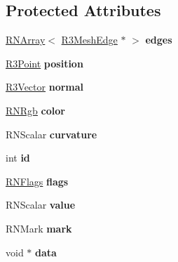 \subsection*{Protected Attributes}
\begin{DoxyCompactItemize}
\item 
\hyperlink{class_r_n_array}{R\+N\+Array}$<$ \hyperlink{class_r3_mesh_edge}{R3\+Mesh\+Edge} $\ast$ $>$ {\bfseries edges}\hypertarget{class_r3_mesh_vertex_ac82c048634a0ff8869a69ea2da8d3710}{}\label{class_r3_mesh_vertex_ac82c048634a0ff8869a69ea2da8d3710}

\item 
\hyperlink{class_r3_point}{R3\+Point} {\bfseries position}\hypertarget{class_r3_mesh_vertex_a6fa33f78f341f24a2385a874323f8a1a}{}\label{class_r3_mesh_vertex_a6fa33f78f341f24a2385a874323f8a1a}

\item 
\hyperlink{class_r3_vector}{R3\+Vector} {\bfseries normal}\hypertarget{class_r3_mesh_vertex_aa923ea74d42e30462aeb01cf34689dbe}{}\label{class_r3_mesh_vertex_aa923ea74d42e30462aeb01cf34689dbe}

\item 
\hyperlink{class_r_n_rgb}{R\+N\+Rgb} {\bfseries color}\hypertarget{class_r3_mesh_vertex_a8c7f99ac5454c989550632784ae80f43}{}\label{class_r3_mesh_vertex_a8c7f99ac5454c989550632784ae80f43}

\item 
R\+N\+Scalar {\bfseries curvature}\hypertarget{class_r3_mesh_vertex_abd8ef10ffc5c6852ae2fd7003d8577fe}{}\label{class_r3_mesh_vertex_abd8ef10ffc5c6852ae2fd7003d8577fe}

\item 
int {\bfseries id}\hypertarget{class_r3_mesh_vertex_a24abbbf6ab2a870e86132ccf689257a0}{}\label{class_r3_mesh_vertex_a24abbbf6ab2a870e86132ccf689257a0}

\item 
\hyperlink{class_r_n_flags}{R\+N\+Flags} {\bfseries flags}\hypertarget{class_r3_mesh_vertex_a5a87fbf4b32130977cff39710e2022c9}{}\label{class_r3_mesh_vertex_a5a87fbf4b32130977cff39710e2022c9}

\item 
R\+N\+Scalar {\bfseries value}\hypertarget{class_r3_mesh_vertex_a3867812487a5b646ee5bee59299a1443}{}\label{class_r3_mesh_vertex_a3867812487a5b646ee5bee59299a1443}

\item 
R\+N\+Mark {\bfseries mark}\hypertarget{class_r3_mesh_vertex_a88522dbdabe18692579ca87e38bec18f}{}\label{class_r3_mesh_vertex_a88522dbdabe18692579ca87e38bec18f}

\item 
void $\ast$ {\bfseries data}\hypertarget{class_r3_mesh_vertex_abe61d88de801bc6cbc7562dbdb032e83}{}\label{class_r3_mesh_vertex_abe61d88de801bc6cbc7562dbdb032e83}

\end{DoxyCompactItemize}
